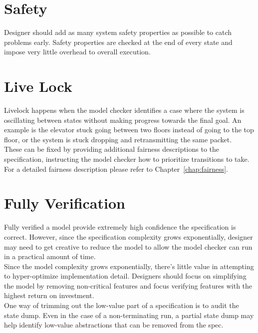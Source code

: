 \section{Safety}

Designer should add as many system safety properties as possible to catch
problems early. Safety properties are checked at the end of every state and
impose very little overhead to overall execution.

\section{Live Lock}

Livelock happens when the model checker identifies a case where the system is 
oscillating between states without making progress towards the final goal.  An
example is the elevator stuck going between two floors instead of going to the
top floor, or the system is stuck dropping and retransmitting the same packet.\\

These can be fixed by providing additional fairness descriptions to the
specification, instructing the model checker how to prioritize transitions to
take.\\

For a detailed fairness description please refer to Chapter~\ref{chap:fairness}.

\section{Fully Verification}

Fully verified a model provide extremely high confidence the specification is
correct. However, since the specification complexity grows exponentially,
designer may need to get creative to reduce the model to allow the model checker can
run in a practical amount of time.\\

Since the model complexity grows exponentially, there's little value in
attempting to hyper-optimize implementation detail. Designers should focus on
simplifying the model by removing non-critical features and focus verifying
features with the highest return on investment.\\

One way of trimming out the low-value part of a specification is to audit the
state dump. Even in the case of a non-terminating run, a partial state dump may
help identify low-value abstractions that can be removed from the spec.\\

